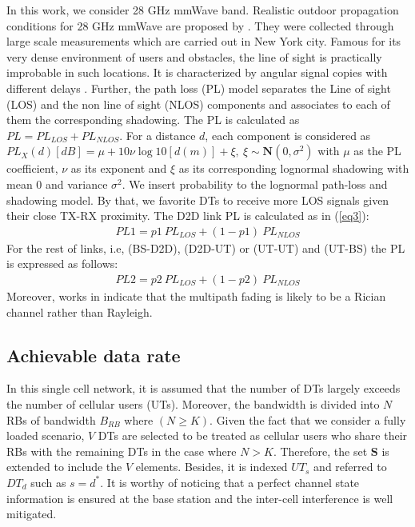 \documentclass[conference,onecolumn,12pt]{IEEEtran}
\begin{document}
In this work, we consider 28 GHz mmWave band. Realistic outdoor propagation conditions for 28 GHz mmWave are proposed by \cite{73PLmodel}. They were collected through large scale measurements which are carried out in New York city. Famous for its very dense environment of users and obstacles, the line of sight is practically improbable in such locations. It is characterized by angular signal copies with different delays \cite{mmWvErkip}.
Further, the path loss (PL) model separates the Line of sight (LOS) and the non line of sight (NLOS) components and associates to each of them the corresponding shadowing. The PL is calculated as $PL=PL_{LOS}+PL_{NLOS}$. For a distance $d$, each component is considered as $PL_{X}(d)[dB]=\mu+10\nu \log10[d(m)]+\xi, \ \xi \sim \mathbf{N}(0,\sigma^2)$ with $\mu$ as the PL coefficient, $\nu$ as its exponent and $\xi$ as its corresponding lognormal shadowing with mean 0 and variance $\sigma^2$. We insert probability to the lognormal path-loss and shadowing model. By that, we favorite DTs to receive more LOS signals given their close TX-RX proximity. The D2D link PL is calculated as in (\ref{eq3}):
\begin{equation} \label{eq3}
\begin{aligned}
PL1=p1\ PL_{LOS}+(1-p1)\ PL_{NLOS}
\end{aligned}
\end{equation}
For the rest of links, i.e, (BS-D2D), (D2D-UT) or (UT-UT) and (UT-BS) the PL is expressed as follows:
\begin{equation} \label{eq4}
\begin{aligned}
PL2=p2\ PL_{LOS}+(1-p2)\ PL_{NLOS}
\end{aligned}
\end{equation}
Moreover, works in \cite{Rice1} indicate that the multipath fading is likely to be a Rician channel rather than Rayleigh.
\subsection{Achievable data rate}
In this single cell network, it is assumed that the number of DTs largely exceeds the number of cellular users (UTs). Moreover, the bandwidth is divided into $N$ RBs of bandwidth $B_{RB}$ where $(N \geq K)$. Given the fact that we consider a fully loaded scenario, $V$ DTs are selected to be treated as cellular users who share their RBs with the remaining DTs in the case where $N>K$. Therefore, the set $\mathbf{S}$ is extended to include the $V$ elements. Besides, it is indexed $UT_s$ and referred to $DT_d$ such as $s=d^{*}$. It is worthy of noticing that a perfect channel state information is ensured at the base station and the inter-cell interference is well mitigated.
\end{document}
